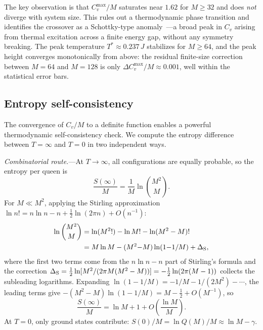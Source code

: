 \documentclass[aps, pre, reprint, amsmath, amssymb, superscriptaddress, floatfix]{revtex4-2}
\begin{document}
The key observation is that $C_v^{\max}/M$ saturates near $1.62$ for
$M \ge 32$ and does \emph{not} diverge with system size.  This rules
out a thermodynamic phase transition and identifies the crossover as a
Schottky-type anomaly~\cite{Binder1997}---a broad peak in $C_v$
arising from thermal excitation across a finite energy gap, without
any symmetry breaking.  The peak temperature $T^* \approx 0.237\,J$
stabilizes for $M \ge 64$, and the peak height converges
monotonically from above: the residual finite-size correction
between $M = 64$ and $M = 128$ is only $\Delta C_v^{\max}/M
\approx 0.001$, well within the statistical error bars.

\subsection{Entropy self-consistency}
\label{sec:entropy_check}

The convergence of $C_v/M$ to a definite function enables a powerful
thermodynamic self-consistency check.  We compute the entropy
difference between $T = \infty$ and $T = 0$ in two independent ways.

\textit{Combinatorial route.}---At $T \to \infty$, all configurations
are equally probable, so the entropy per queen is
\begin{equation}
  \frac{S(\infty)}{M}
  = \frac{1}{M}\ln\binom{M^2}{M}.
  \label{eq:Sinf_def}
\end{equation}
For $M \ll M^2$, applying the Stirling approximation
$\ln n! = n\ln n - n + \tfrac{1}{2}\ln(2\pi n) + O(n^{-1})$:
\begin{align}
  \ln\binom{M^2}{M}
  &= \ln(M^2!) - \ln M! - \ln(M^2 - M)! \notag\\
  &= M\ln M - (M^2{-}M)\ln(1{-}1/M)
  + \Delta_{\rm S},
  \label{eq:Sinf_stirling}
\end{align}
where the first two terms come from the $n\ln n - n$ part of Stirling's
formula and the correction
$\Delta_{\rm S} = \tfrac{1}{2}\ln[M^2/(2\pi M(M^2-M))]
= -\tfrac{1}{2}\ln(2\pi(M-1))$ collects the subleading logarithms.
Expanding $\ln(1 - 1/M) = -1/M - 1/(2M^2) - \cdots$, the
leading terms give $-(M^2-M)\ln(1-1/M) = M - \tfrac{1}{2} + O(M^{-1})$,
so
\begin{equation}
  \frac{S(\infty)}{M}
  = \ln M + 1 + O\!\left(\frac{\ln M}{M}\right).
  \label{eq:Sinf}
\end{equation}
At $T = 0$, only ground states contribute:
$S(0)/M = \ln Q(M)/M \approx \ln M - \gamma$.
\end{document}
